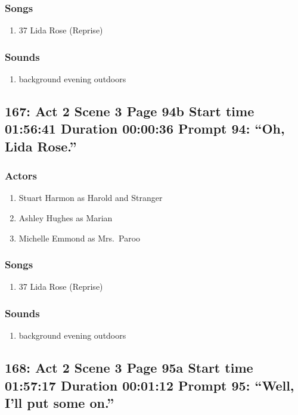 \subsubsection{Songs}
\begin{enumerate}
\item 37 Lida Rose (Reprise)
\end{enumerate}\subsubsection{Sounds}
\begin{enumerate}
\item background evening outdoors
\end{enumerate}
\subsection{167: Act 2 Scene 3 Page 94b Start time 01:56:41 Duration 00:00:36 Prompt 94: ``Oh, Lida Rose.''}

\subsubsection{Actors}
\begin{enumerate}
\item Stuart Harmon as Harold and Stranger
\item Ashley Hughes as Marian
\item Michelle Emmond as Mrs.~Paroo
\end{enumerate}

\subsubsection{Songs}
\begin{enumerate}
\item 37 Lida Rose (Reprise)
\end{enumerate}\subsubsection{Sounds}
\begin{enumerate}
\item background evening outdoors
\end{enumerate}
\subsection{168: Act 2 Scene 3 Page 95a Start time 01:57:17 Duration 00:01:12 Prompt 95: ``Well, I'll put some on.''}

